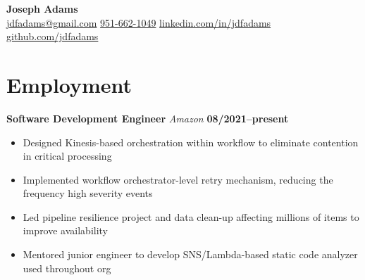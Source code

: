 \documentclass[12pt]{article}
\title{\fullname}
\makeatletter
\newcommand\fullname{Joseph Adams}
\newcommand\email{jdfadams@gmail.com}
\newcommand\phone{951-662-1049}
\newcommand\verticalspace{\vspace{0.5cm}}
\makeatother
\begin{document}
\begin{center}
  \textbf{\Large\fullname} \\[\baselineskip]
  \href{mailto:\email}{\email} \quad
  \href{tel:\phone}{\phone} \quad
  \href{http://linkedin.com/in/jdfadams}{linkedin.com/in/jdfadams} \quad
  \href{http://github.com/jdfadams}{github.com/jdfadams}
\end{center}

\section*{Employment}
\textbf{Software Development Engineer} \emph{Amazon} \hfill \textbf{08/2021--present}
\begin{itemize}
  \item Designed Kinesis-based orchestration within workflow to eliminate contention in critical processing
  \item Implemented workflow orchestrator-level retry mechanism, reducing the frequency high severity events
  \item Led pipeline resilience project and data clean-up affecting millions of items to improve availability
  \item Mentored junior engineer to develop SNS/Lambda-based static code analyzer used throughout org
\end{itemize}

\verticalspace
\end{document}
